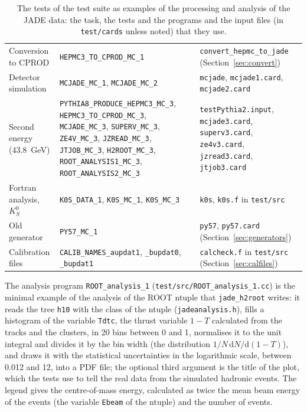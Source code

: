 \begin{table}[H]
\begin{tabular}{|p{2.9cm}|p{5.4cm}|p{6.0cm}|}
Conversion to CPROD & \texttt{HEPMC3\_\allowbreak{}TO\_\allowbreak{}CPROD\_\allowbreak{}MC\_\allowbreak{}1} & \texttt{convert\_\allowbreak{}hepmc\_\allowbreak{}to\_\allowbreak{}jade} (Section~\ref{sec:convert}) \\
Detector simulation & \texttt{MCJADE\_\allowbreak{}MC\_\allowbreak{}1}, \texttt{MCJADE\_\allowbreak{}MC\_\allowbreak{}2} & \texttt{mcjade}, \texttt{mcjade1.card}, \texttt{mcjade2.card} \\
Second energy (43.8~GeV) & \texttt{PYTHIA8\_\allowbreak{}PRODUCE\_\allowbreak{}HEPMC3\_\allowbreak{}MC\_\allowbreak{}3}, \texttt{HEPMC3\_\allowbreak{}TO\_\allowbreak{}CPROD\_\allowbreak{}MC\_\allowbreak{}3}, \texttt{MCJADE\_\allowbreak{}MC\_\allowbreak{}3}, \texttt{SUPERV\_\allowbreak{}MC\_\allowbreak{}3}, \texttt{ZE4V\_\allowbreak{}MC\_\allowbreak{}3}, \texttt{JZREAD\_\allowbreak{}MC\_\allowbreak{}3}, \texttt{JTJOB\_\allowbreak{}MC\_\allowbreak{}3}, \texttt{H2ROOT\_\allowbreak{}MC\_\allowbreak{}3}, \texttt{ROOT\_\allowbreak{}ANALYSIS1\_\allowbreak{}MC\_\allowbreak{}3}, \texttt{ROOT\_\allowbreak{}ANALYSIS2\_\allowbreak{}MC\_\allowbreak{}3} & \texttt{testPythia2.input}, \texttt{mcjade3.card}, \texttt{superv3.card}, \texttt{ze4v3.card}, \texttt{jzread3.card}, \texttt{jtjob3.card} \\
Fortran analysis, $K^0_S$ & \texttt{K0S\_\allowbreak{}DATA\_\allowbreak{}1}, \texttt{K0S\_\allowbreak{}MC\_\allowbreak{}1}, \texttt{K0S\_\allowbreak{}MC\_\allowbreak{}3} & \texttt{k0s}, \texttt{k0s.f} in \texttt{test/src} \\
Old generator & \texttt{PY57\_\allowbreak{}MC\_\allowbreak{}1} & \texttt{py57}, \texttt{py57.card} (Section~\ref{sec:generators}) \\
Calibration files & \texttt{CALIB\_\allowbreak{}NAMES\_\allowbreak{}aupdat1}, \texttt{\_bupdat0}, \texttt{\_bupdat1} & \texttt{calcheck.f} in \texttt{test/src} (Section~\ref{sec:calfiles}) \\
\hline
\end{tabular}
\caption{The tests of the test suite as examples of the processing and analysis of the JADE data: the task, the tests and the programs and the input files (in \texttt{test/\allowbreak{}cards} unless noted) that they use.}
\label{tab:testexamples}
\end{table}
The analysis program \texttt{ROOT\_analysis\_1} (\texttt{test/\allowbreak{}src/\allowbreak{}ROOT\_analysis\_1.cc}) is the minimal example of the analysis of the ROOT ntuple that \texttt{jade\_h2root} writes: it reads the tree \texttt{h10}
with the class of the ntuple (\texttt{jadeanalysis.h}), fills a histogram of the variable \texttt{Tdtc}, the thrust variable $1-T$ calculated from the tracks and the clusters, in 20 bins between 0 and 1, normalises it to the unit integral and divides it by the bin width (the distribution $1/N\,\mathrm{d}N/\mathrm{d}(1-T)$), and draws it with the statistical uncertainties in the logarithmic scale, between 0.012 and 12, into a PDF file; the optional third argument is the title of the plot, which the tests use to tell the real data from the simulated hadronic events. The legend gives the centre-of-mass energy, calculated as twice the mean beam energy of the events (the variable \texttt{Ebeam} of the ntuple) and the number of events.
